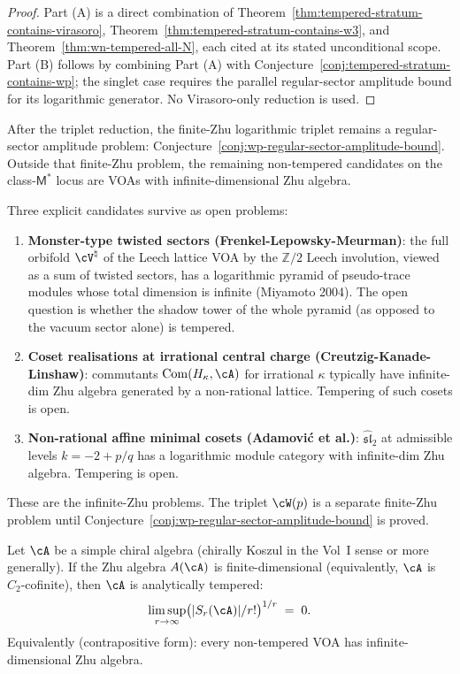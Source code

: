 \begin{proof}
Part (A) is a direct combination of
Theorem~\ref{thm:tempered-stratum-contains-virasoro},
Theorem~\ref{thm:tempered-stratum-contains-w3}, and
Theorem~\ref{thm:wn-tempered-all-N}, each cited at its stated
unconditional scope. Part (B) follows by combining Part (A) with
Conjecture~\ref{conj:tempered-stratum-contains-wp}; the singlet case
requires the parallel regular-sector amplitude bound for its
logarithmic generator. No Virasoro-only reduction is used.
\end{proof}

\begin{remark}
\label{rem:non-tempered-frontier-unbounded-zhu}
After the triplet reduction, the finite-Zhu logarithmic triplet remains
a regular-sector amplitude problem:
Conjecture~\ref{conj:wp-regular-sector-amplitude-bound}. Outside that
finite-Zhu problem, the remaining non-tempered candidates on the
class-$\mathsf{M}^*$ locus are VOAs with infinite-dimensional Zhu
algebra.

Three explicit candidates survive as open problems:
\begin{enumerate}[nosep]
\item \textbf{Monster-type twisted sectors (Frenkel-Lepowsky-Meurman)}:
 the full orbifold $\cV^\natural$ of the Leech lattice VOA by the
 $\mathbb{Z} / 2$ Leech involution, viewed as a sum of twisted sectors,
 has a logarithmic pyramid of pseudo-trace modules whose total
 dimension is infinite (Miyamoto 2004). The open question
 is whether the shadow tower of the whole pyramid (as opposed to
 the vacuum sector alone) is tempered.
\item \textbf{Coset realisations at irrational central charge
 (Creutzig-Kanade-Linshaw)}: commutants
 $\mathrm{Com}(H_{\kappa}, \cA)$ for irrational $\kappa$ typically
 have infinite-dim Zhu algebra generated by a non-rational lattice.
 Tempering of such cosets is open.
\item \textbf{Non-rational affine minimal cosets
 (Adamovi\'c et al.)}: $\widehat{\mathfrak{sl}}_2$ at admissible
 levels $k = -2 + p/q$ has a logarithmic module category with
 infinite-dim Zhu algebra. Tempering is open.
\end{enumerate}
These are the infinite-Zhu problems. The triplet $\cW(p)$ is a
separate finite-Zhu problem until
Conjecture~\ref{conj:wp-regular-sector-amplitude-bound} is proved.
\end{remark}

\begin{conjecture}
\label{conj:tempered-unbounded-zhu}
Let $\cA$ be a simple chiral algebra (chirally Koszul in the Vol~I
sense or more generally). If the Zhu algebra $A(\cA)$ is finite-dimensional
(equivalently, $\cA$ is $C_2$-cofinite), then $\cA$ is analytically
tempered:
\[
 \limsup_{r \to \infty}
 \bigl( \lvert S_r(\cA) \rvert / r! \bigr)^{1/r}
 \;=\; 0.
\]
Equivalently (contrapositive form): every non-tempered VOA has
infinite-dimensional Zhu algebra.
\end{conjecture}

